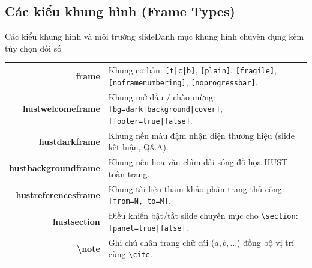 \documentclass[aspectratio=169,10pt]{beamer}
\begin{document}
\subsection{Các kiểu khung hình (Frame Types)}
\begin{frame}{Các kiểu khung hình và môi trường slide}{Danh mục khung hình chuyên dụng kèm tùy chọn đối số}
  \scriptsize
  \centering
  \begin{tabularx}{\textwidth}{>{\ttfamily\bfseries\color{hustmain}}r >{\small\raggedright\arraybackslash}X}
    frame               & Khung cơ bản: \texttt{[t|c|b]}, \texttt{[plain]}, \texttt{[fragile]}, \texttt{[noframenumbering]}, \texttt{[noprogressbar]}. \\
    hustwelcomeframe    & Khung mở đầu / chào mừng: \texttt{[bg=dark|background|cover]}, \texttt{[footer=true|false]}. \\
    hustdarkframe       & Khung nền màu đậm nhận diện thương hiệu (slide kết luận, Q\&A). \\
    hustbackgroundframe & Khung nền hoa văn chìm dải sóng đồ họa HUST toàn trang. \\
    hustreferencesframe & Khung tài liệu tham khảo phân trang thủ công: \texttt{[from=N, to=M]}. \\
    hustsection         & Điều khiển bật/tắt slide chuyển mục cho \texttt{\textbackslash section}: \texttt{[panel=true|false]}. \\
    \textbackslash note & Ghi chú chân trang chữ cái ($a, b, \dots$) đồng bộ vị trí cùng \texttt{\textbackslash cite}. \\
  \end{tabularx}
\end{frame}
\end{document}
